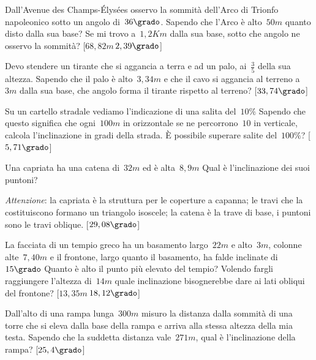 \begin{multicols}{2}
\begin{esercizio}[\Ast]
\label{ese:G.62}
Dall'Avenue des Champs-Élysées osservo la sommità dell'Arco di Trionfo 
napoleonico sotto un angolo di~$36\grado$.
Sapendo che l'Arco è alto~$50\unit{m}$ quanto disto dalla sua base? Se mi trovo 
a~$1,2\unit{Km}$ dalla sua base,
sotto che angolo ne osservo la sommità?
\hfill [$68,82\unit{m}$\,$2,39\grado$]
\end{esercizio}

\begin{esercizio}[\Ast]
\label{ese:G.63}
Devo stendere un tirante che si aggancia a terra e ad un palo, ai~$\frac{3}{5}$ 
della sua altezza.
Sapendo che il palo è alto~$3,34\unit{m}$ e che il cavo si aggancia al terreno 
a~$3\unit{m}$ dalla sua base,
che angolo forma il tirante rispetto al terreno?
\hfill [$33,74\grado$]
\end{esercizio}

\begin{esercizio}[\Ast]
\label{ese:G.64}
Su un cartello stradale vediamo l'indicazione di una salita del~$10\%$ Sapendo 
che questo significa che ogni~$100\unit{m}$
in orizzontale se ne percorrono~$10$ in verticale, calcola l'inclinazione in 
gradi della strada. È possibile superare salite del~$100\%$?
\hfill [$5,71\grado$]
\end{esercizio}

\begin{esercizio}[\Ast]
\label{ese:G.65}
Una capriata ha una catena di~$32\unit{m}$ ed è alta~$8,9\unit{m}$ Qual è 
l'inclinazione dei suoi puntoni?

\emph{Attenzione}: la capriata è la struttura per le coperture a 
{\textquotedbl}capanna{\textquotedbl}; le travi che la costituiscono
formano un triangolo isoscele; la catena è la trave di base, i puntoni sono le 
travi oblique.
\hfill [$29,08\grado$]
\end{esercizio}

\begin{esercizio}[\Ast]
\label{ese:G.66}
La facciata di un tempio greco ha un basamento largo~$22\unit{m}$ e 
alto~$3\unit{m}$, colonne alte~$7,40\unit{m}$ e il frontone,
largo quanto il basamento, ha falde inclinate di~$15\grado$ Quanto è alto il 
punto più elevato del tempio?
Volendo fargli raggiungere l'altezza di~$14\unit{m}$ quale inclinazione 
bisognerebbe dare ai lati obliqui del frontone?
\hfill [$13,35\unit{m}$\,$18,12\grado$]
\end{esercizio}

\begin{esercizio}[\Ast]
\label{ese:G.67}
Dall'alto di una rampa lunga~$300\unit{m}$ misuro la distanza dalla sommità di 
una torre che si eleva dalla base della rampa e arriva
alla stessa altezza della mia testa. Sapendo che la suddetta distanza 
vale~$271\unit{m}$, qual è l'inclinazione della rampa?
\hfill [$25,4\grado$]
\end{esercizio}
\end{multicols}


